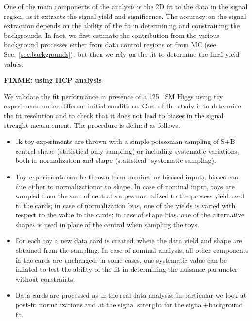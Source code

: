 One of the main components of the analysis is the 2D fit to the data in the signal region, 
as it extracts the signal yield and significance.
The accuracy on the signal extraction depends on the ability of the fit in determining 
and constraining the backgrounds.
In fact, we first estimate the contribution from the various background processes 
either from data control regions or from MC (see Sec.~\ref{sec:backgrounds}), 
but then we rely on the fit to determine the final yield values. 

{\bf FIXME: using HCP analysis}

We validate the fit performance in presence of a 125 \GeV\ SM Higgs using toy experiments 
under different initial conditions.
Goal of the study is to determine the fit resolution and to check that it does not lead to 
biases in the signal strenght measurement. The procedure is defined as follows.
\begin{itemize}
\item 1k toy experiments are thrown with a simple poissonian sampling of S+B central shape (statistical only sampling)
or including systematic variations, both in normalization and shape (statistical+systematic sampling). 
\item Toy experiments can be thrown from nominal or biassed inputs; biases can due either to normalizationor to shape. 
In case of nominal input, toys are sampled from the sum of central shapes normalized to the process yield used in the cards;
in case of normalization bias, one of the yields is varied with respect to the value in the cards; 
in case of shape bias, one of the alternative shapes is used in place of the central when sampling the toys.
\item For each toy a new data card is created, where the data yield and shape are obtained from the sampling.
In case of nominal analysis, all other components in the cards are unchanged; 
in some cases, one systematic value can be inflated to test the ability of the fit in determining 
the nuisance parameter without constraints.
\item Data cards are processed as in the real data analysis; in particular we look at post-fit normalizations 
and at the signal strenght for the signal+background fit.
\end{itemize}


